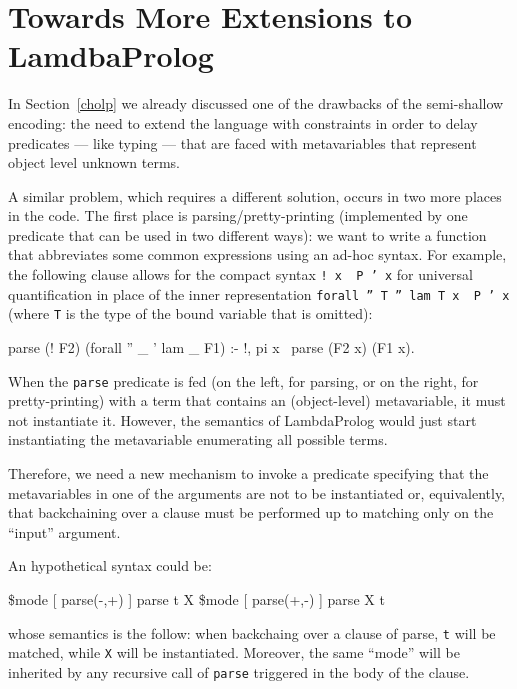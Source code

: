 \documentclass[preprint]{sigplanconf}
\begin{document}
\section{Towards More Extensions to LamdbaProlog}

In Section~\ref{cholp} we already discussed one of the drawbacks of the semi-shallow encoding: the need to extend the language with constraints in order to delay predicates --- like typing --- that are faced with metavariables that represent object level unknown terms.

A similar problem, which requires a different solution, occurs in two more places in the code. The first place is parsing/pretty-printing (implemented by one predicate that can be used in two different ways): we want to write a function that abbreviates some common expressions using an ad-hoc syntax. For example, the following clause allows for the compact syntax \texttt{! x \ P ' x} for universal quantification in place of the inner representation \texttt{forall '' T '' lam T x \ P ' x} (where \texttt{T} is the type of the bound variable that is omitted):
\begin{verb}
parse (! F2) (forall '' _ ' lam _ F1) :- !, pi x \ parse (F2 x) (F1 x).
\end{verb}

When the \verb+parse+ predicate is fed (on the left, for parsing, or on the right, for pretty-printing) with a term that contains an (object-level) metavariable, it must not instantiate it. However, the semantics of LambdaProlog would just start instantiating the metavariable enumerating all possible terms.

Therefore, we need a new mechanism to invoke a predicate specifying that the metavariables in one of the arguments are not to be instantiated or, equivalently, that backchaining over a clause must be performed up to matching only on the ``input'' argument.

An hypothetical syntax could be:

\begin{verb}
\$mode [ parse(-,+) ] parse t X  %
\$mode [ parse(+,-) ] parse X t  %
\end{verb}

whose semantics is the follow: when backchaing over a clause of parse, \verb+t+
will be matched, while \verb+X+ will be instantiated. Moreover, the same ``mode'' will be inherited by any recursive call of \verb+parse+ triggered in the body of the clause.
\end{document}
